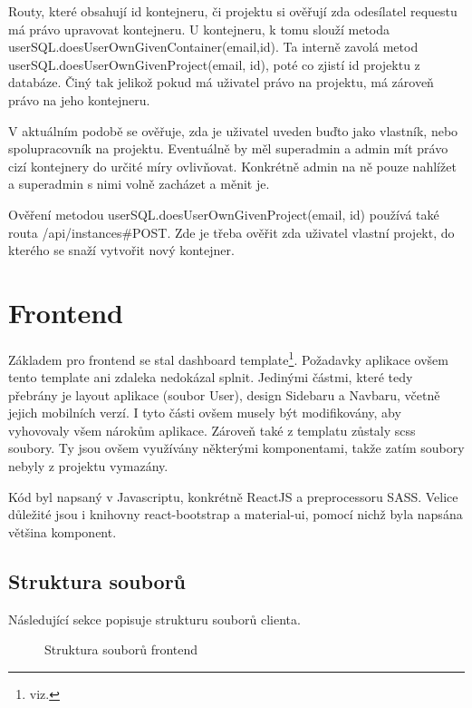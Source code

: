 \documentclass[a4paper,oneside,12pt]{report}
\begin{document}
Routy, které obsahují id kontejneru, či projektu si ověřují zda odesílatel requestu má právo upravovat kontejneru.
U kontejneru, k tomu slouží metoda userSQL.doesUser\linebreak OwnGivenContainer(email,id).
Ta interně zavolá metod userSQL.doesUserOwnGiven\linebreak Project(email, id), poté co zjistí id projektu z databáze.
Činý tak jelikož pokud má uživatel právo na projektu, má zároveň právo na jeho kontejneru.

V aktuálním podobě se ověřuje, zda je uživatel uveden buďto jako vlastník, nebo spolupracovník na projektu.
Eventuálně by měl superadmin a admin mít právo cizí kontejnery do určité míry ovlivňovat.
Konkrétně admin na ně pouze nahlížet a superadmin s nimi volně zacházet a měnit je.

Ověření metodou userSQL.doesUserOwnGivenProject(email, id) používá také routa /api/instances\#POST.
Zde je třeba ověřit zda uživatel vlastní projekt, do kterého se snaží vytvořit nový kontejner.


\chapter{Frontend}

Základem pro frontend se stal dashboard template\footnote{viz. }.
 Požadavky aplikace ovšem tento template ani zdaleka nedokázal splnit. Jedinými částmi, které tedy přebrány je layout aplikace (soubor User), design Sidebaru a Navbaru, včetně jejich mobilních verzí.
 I tyto části ovšem musely být modifikovány, aby vyhovovaly všem nárokům aplikace.
 Zároveň také z templatu zůstaly scss soubory.
 Ty jsou ovšem využívány některými komponentami, takže zatím soubory nebyly z projektu vymazány.

 Kód byl napsaný v Javascriptu, konkrétně ReactJS a preprocessoru SASS. Velice důležité jsou i knihovny react-bootstrap a material-ui, pomocí nichž byla napsána většina komponent.

\section{Struktura souborů}

Následující sekce popisuje strukturu souborů clienta.

\begin{figure}[h]
	\caption[Struktura souborů frontendu, vlastní tvorba]{Struktura souborů frontend}
	\label{fig:frontendStructure}
\end{figure}
\end{document}
